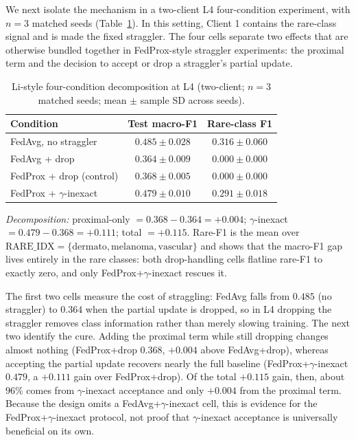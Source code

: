 \documentclass[11pt,a4paper]{report}
\begin{document}
We next isolate the mechanism in a two-client L4 four-condition experiment,
with $n=3$ matched seeds (Table~\ref{tab:li-decomp-l4}). In this setting,
Client 1 contains the rare-class signal and is made the fixed straggler. The
four cells separate two effects that are otherwise bundled together in
FedProx-style straggler experiments: the proximal term and the decision to
accept or drop a straggler's partial update.

\begin{table}[H]
\centering
\caption{Li-style four-condition decomposition at L4 (two-client; $n=3$
matched seeds; mean $\pm$ sample SD across seeds).}
\label{tab:li-decomp-l4}
\small
\begin{tabular}{lcc}
\toprule
Condition                                       & Test macro-F1                & Rare-class F1 \\
\midrule
FedAvg, no straggler                            & $0.485 \pm 0.028$            & $0.316 \pm 0.060$ \\
FedAvg + drop                                   & $0.364 \pm 0.009$            & $0.000 \pm 0.000$ \\
FedProx + drop (control)                        & $0.368 \pm 0.005$            & $0.000 \pm 0.000$ \\
FedProx + $\gamma$-inexact                      & $\mathbf{0.479 \pm 0.010}$   & $\mathbf{0.291 \pm 0.018}$ \\
\bottomrule
\end{tabular}

\smallskip
\noindent\textit{Decomposition:} proximal-only $= 0.368 - 0.364 = +0.004$;
$\gamma$-inexact $= 0.479 - 0.368 = +0.111$; total $= +0.115$. Rare-F1 is
the mean over $\mathrm{RARE\_IDX} = \{\text{dermato}, \text{melanoma},
\text{vascular}\}$ and shows that the macro-F1 gap lives entirely in the
rare classes: both drop-handling cells flatline rare-F1 to exactly zero,
and only FedProx+$\gamma$-inexact rescues it.
\end{table}

The first two cells measure the cost of straggling: FedAvg falls from $0.485$
(no straggler) to $0.364$ when the partial update is dropped, so in L4 dropping
the straggler removes class information rather than merely slowing training. The
next two identify the cure. Adding the proximal term while still dropping changes
almost nothing (FedProx+drop $0.368$, $+0.004$ above FedAvg+drop), whereas
accepting the partial update recovers nearly the full baseline
(FedProx+$\gamma$-inexact $0.479$, a $+0.111$ gain over FedProx+drop). Of the
total $+0.115$ gain, then, about $96\%$ comes from $\gamma$-inexact acceptance and
only $+0.004$ from the proximal term. Because the design omits a
FedAvg+$\gamma$-inexact cell, this is evidence for the FedProx+$\gamma$-inexact
protocol, not proof that $\gamma$-inexact acceptance is universally beneficial on
its own.
\end{document}
